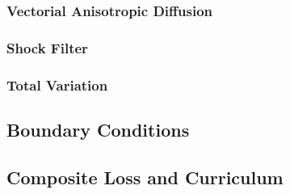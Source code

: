 \documentclass[conference]{IEEEtran}
\newcommand{\grad}{\nabla}
\newcommand{\divg}{\mathrm{div}}
\newcommand{\loss}{\mathcal{L}}
\begin{document}
\subsubsection{Vectorial Anisotropic Diffusion}

\subsubsection{Shock Filter}

\subsubsection{Total Variation}

\subsection{Boundary Conditions}

\subsection{Composite Loss and Curriculum}
\end{document}
